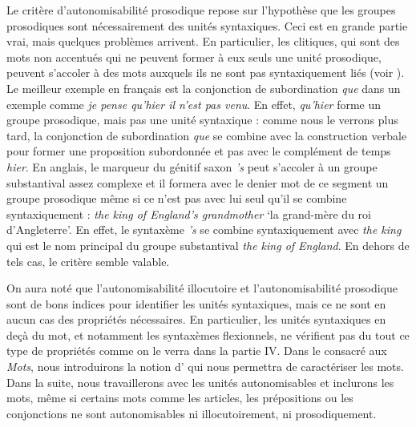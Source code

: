 \begin{sloppypar}
Le critère d’autonomisabilité prosodique repose sur l’hypothèse que les groupes prosodiques sont nécessairement des unités syntaxiques. Ceci est en grande partie vrai, mais quelques problèmes arrivent. En particulier, les clitiques, qui sont des mots non accentués qui ne peuvent former à eux seuls une unité prosodique, peuvent s’accoler à des mots auxquels ils ne sont pas syntaxiquement liés (voir ). Le meilleur exemple en français est la conjonction de subordination \textit{que} dans un exemple comme \textit{je pense {\textbar} qu’hier {\textbar} il n’est pas venu}. En effet, \textit{qu’hier} forme un groupe prosodique, mais pas une unité syntaxique : comme nous le verrons plus tard, la conjonction de subordination \textit{que} se combine avec la construction verbale pour former une proposition subordonnée et pas avec le complément de temps \textit{hier}. En anglais, le marqueur du génitif saxon \textit{’s} peut s’accoler à un groupe substantival assez complexe et il formera avec le denier mot de ce segment un groupe prosodique même si ce n’est pas avec lui seul qu’il se combine syntaxiquement : \textit{the king {\textbar} of England’s {\textbar} grandmother} ‘la grand-mère du roi d’Angleterre’. En effet, le syntaxème \textit{’s} se combine syntaxiquement avec \textit{the king} qui est le nom principal du groupe substantival \textit{the king of England}. En dehors de tels cas, le critère semble valable.
\end{sloppypar}

On aura noté que l’autonomisabilité illocutoire et l’autonomisabilité prosodique sont de bons indices pour identifier les unités syntaxiques, mais ce ne sont en aucun cas des propriétés nécessaires. En particulier, les unités syntaxiques en deçà du mot, et notamment les syntaxèmes flexionnels, ne vérifient pas du tout ce type de propriétés comme on le verra dans la partie IV. Dans le  consacré aux \textit{Mots}, nous introduirons la notion d’ qui nous permettra de caractériser les mots. Dans la suite, nous travaillerons avec les unités autonomisables et inclurons les mots, même si certains mots comme les articles, les prépositions ou les conjonctions ne sont autonomisables ni illocutoirement, ni prosodiquement.

